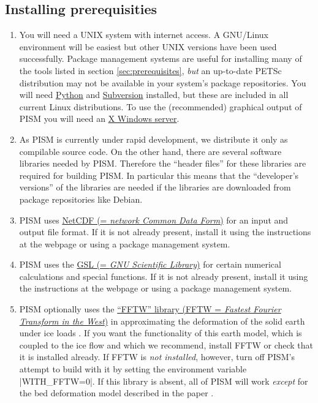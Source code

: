 \documentclass[11pt,final]{amsart}
\begin{document}
\subsection{Installing prerequisities}
\renewcommand{\labelenumi}{\textbf{\arabic{enumi}.}~}
\begin{enumerate}
\item You will need a UNIX system with internet access. A GNU/Linux environment will be easiest but other UNIX versions have been
  used successfully. Package management systems are useful for installing many of the tools listed in section
  \ref{sec:prerequisites}, \emph{but} an up-to-date PETSc distribution may not be available in your system's package
  repositories. You will need \href{http://www.python.org/}{Python} and \href{http://subversion.tigris.org/}{Subversion}
  installed, but these are included in all current Linux distributions. To use the (recommended) graphical output of PISM you will
  need an \href{http://www.x.org/}{X Windows server}.

\item As PISM is currently under rapid development, we distribute it only as compilable source code. On the other hand, there are
  several software libraries needed by PISM. Therefore the ``header files'' for these libraries are required for building PISM. In
  particular this means that the ``developer's versions'' of the libraries are needed if the libraries are downloaded from package
  repositories like Debian.

\item PISM uses \href{http://www.unidata.ucar.edu/software/netcdf/}{NetCDF (= \emph{network Common Data Form})} for
  an input and output file format. If it is not already present, install it using the instructions at the webpage or using a
  package management system.

\item PISM uses the \href{http://www.gnu.org/software/gsl/}{GSL (= \emph{GNU Scientific Library})} for certain numerical calculations and special functions. If it is not already present, install it using the
  instructions at the webpage or using a package management system.

\item PISM optionally uses the \href{http://www.fftw.org/}{``FFTW'' library (FFTW = \emph{Fastest Fourier Transform in the
      West})} in approximating the deformation of the solid earth under
  ice loads \cite{BLKfastearth}. If you want the functionality of this earth model, which is coupled to the ice flow and which we
  recommend, install FFTW or check that it is installed already. If FFTW is \emph{not installed}, however, turn off PISM's attempt
  to build with it by setting the environment variable |WITH_FFTW=0|. If this library is absent, all of PISM will work
  \emph{except} for the bed deformation model described in the paper \cite{BLKfastearth}.


\end{enumerate}
\end{document}
